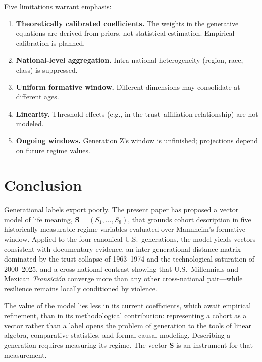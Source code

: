 \documentclass[conference]{IEEEtran}
\begin{document}
Five limitations warrant emphasis:

\begin{enumerate}
  \item \textbf{Theoretically calibrated coefficients.} The weights in the generative equations are derived from priors, not statistical estimation. Empirical calibration is planned.
  \item \textbf{National-level aggregation.} Intra-national heterogeneity (region, race, class) is suppressed.
  \item \textbf{Uniform formative window.} Different dimensions may consolidate at different ages.
  \item \textbf{Linearity.} Threshold effects (e.g., in the trust--affiliation relationship) are not modeled.
  \item \textbf{Ongoing windows.} Generation Z's window is unfinished; projections depend on future regime values.
\end{enumerate}

\section{Conclusion}
\label{sec:conclusion}

Generational labels export poorly. The present paper has proposed a vector model of life meaning, $\mathbf{S} = (S_1, \ldots, S_8)$, that grounds cohort description in five historically measurable regime variables evaluated over Mannheim's formative window. Applied to the four canonical U.S.\ generations, the model yields vectors consistent with documentary evidence, an inter-generational distance matrix dominated by the trust collapse of 1963--1974 and the technological saturation of 2000--2025, and a cross-national contrast showing that U.S.\ Millennials and Mexican \textit{Transici\'on} converge more than any other cross-national pair---while resilience remains locally conditioned by violence.

The value of the model lies less in its current coefficients, which await empirical refinement, than in its methodological contribution: representing a cohort as a vector rather than a label opens the problem of generation to the tools of linear algebra, comparative statistics, and formal causal modeling. Describing a generation requires measuring its regime. The vector $\mathbf{S}$ is an instrument for that measurement.
\end{document}
